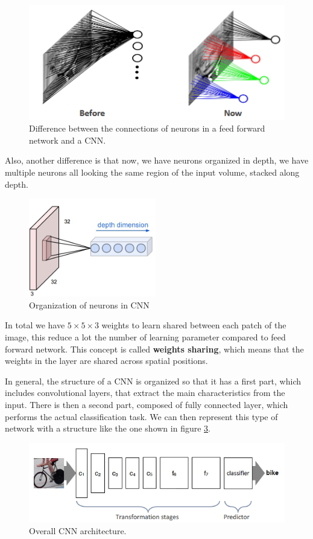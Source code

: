 \begin{figure}[!ht]
    \centering
    \includegraphics[width=0.5\linewidth]{img/CNN/localConn.png}
    \caption{Difference between the connections of neurons in a feed forward
        network and a CNN.}
    \label{fig:localConn}
\end{figure}

Also, another difference is that now, we have neurons organized in depth, we have
multiple neurons all looking the same region of the input volume, stacked along depth.

\begin{figure}[!ht]
    \centering
    \includegraphics[width=0.25\linewidth]{img/CNN/depth.png}
    \caption{Organization of neurons in CNN}
    \label{fig:depth}
\end{figure}

In total we have $5\times 5\times 3$ weights to learn shared between each patch
of the image, this reduce a lot the number of learning parameter compared to
feed forward network. This concept is called \textbf{weights sharing}, which means
that the weights in the layer are shared across spatial positions.

In general, the structure of a CNN is organized so that it has a first part,
which includes convolutional layers, that extract the main characteristics from
the input. There is then a second part, composed of fully connected layer, which
performs the actual classification task. We can then represent this type of
network with a structure like the one shown in figure \ref{fig:cnnarc}.

\begin{figure}[!ht]
    \centering
    \includegraphics[width=\linewidth]{img/CNN/CNNarc.png}
    \caption{Overall CNN architecture.}
    \label{fig:cnnarc}
\end{figure}

